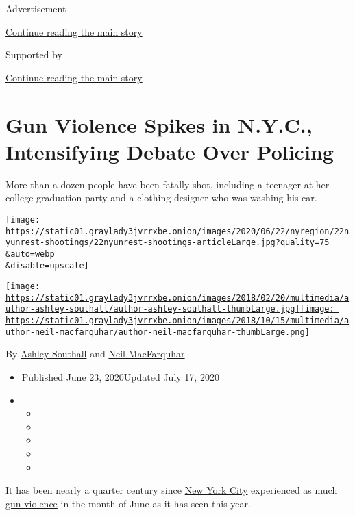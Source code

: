 Advertisement

\protect\hyperlink{after-top}{Continue reading the main story}

Supported by

\protect\hyperlink{after-sponsor}{Continue reading the main story}

\hypertarget{gun-violence-spikes-in-nyc-intensifying-debate-over-policing}{%
\section{Gun Violence Spikes in N.Y.C., Intensifying Debate Over
Policing}\label{gun-violence-spikes-in-nyc-intensifying-debate-over-policing}}

More than a dozen people have been fatally shot, including a teenager at
her college graduation party and a clothing designer who was washing his
car.

\texttt{[image: https://static01.graylady3jvrrxbe.onion/images/2020/06/22/nyregion/22nyunrest-shootings/22nyunrest-shootings-articleLarge.jpg?quality=75\\\&auto=webp\\\&disable=upscale]}

\href{https://www.nytimes3xbfgragh.onion/by/ashley-southall}{\texttt{[image: https://static01.graylady3jvrrxbe.onion/images/2018/02/20/multimedia/author-ashley-southall/author-ashley-southall-thumbLarge.jpg]}}\href{https://www.nytimes3xbfgragh.onion/by/neil-macfarquhar}{\texttt{[image: https://static01.graylady3jvrrxbe.onion/images/2018/10/15/multimedia/author-neil-macfarquhar/author-neil-macfarquhar-thumbLarge.png]}}

By \href{https://www.nytimes3xbfgragh.onion/by/ashley-southall}{Ashley
Southall} and
\href{https://www.nytimes3xbfgragh.onion/by/neil-macfarquhar}{Neil
MacFarquhar}

\begin{itemize}
\item
  Published June 23, 2020Updated July 17, 2020
\item
  \begin{itemize}
  \item
  \item
  \item
  \item
  \item
  \end{itemize}
\end{itemize}

It has been nearly a quarter century since
\href{https://www.nytimes3xbfgragh.onion/2020/07/15/nyregion/nyc-shootings.html}{New
York City} experienced as much
\href{https://www.nytimes3xbfgragh.onion/2020/07/15/nyregion/nyc-shootings.html}{gun
violence} in the month of June as it has seen this year.

